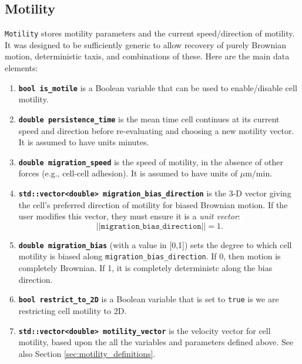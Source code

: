 \documentclass[12pt]{article}
\newcommand{\norm}[1]{\left|\left|{#1}\right|\right|}
\newcommand{\beq}{\begin{equation}}
\newcommand{\eeq}{\end{equation}}
\newcommand{\micron}{\mu\textrm{m}}
\renewcommand{\v}{\verb}
\newcommand{\smallcode}[1]{\textbf{\texttt{#1}}}
\newcommand{\blue}[1]{\textcolor{blue}{#1}}
\newcommand{\DONE}{}%
\begin{document}
\subsection{Motility \DONE}
\label{sec:Motility}
\v|Motility| stores motility parameters and the current speed/direction of motility. It was designed to be sufficiently 
generic to allow recovery of purely Brownian motion, deterministic taxis, and combinations of these. Here are the main 
data elements: 
\begin{enumerate}
\item
\smallcode{bool is\_motile} is a Boolean variable that can be used to enable/disable cell motility. 

\item 
\smallcode{double persistence\_time} is the mean time cell continues at its current speed and direction before 
re-evaluating and choosing a new motility vector. It is assumed to have units minutes. 

\item 
\smallcode{double migration\_speed} is the speed of motility, in the absence of other forces (e.g., cell-cell adhesion). It is 
assumed to have units of $\micron/\textrm{min}$. 

\item 
\smallcode{std::vector<double> migration\_bias\_direction} is the 3-D vector giving the cell's preferred direction of 
motility for biased Brownian motion. If the user modifies this vector, 
they must ensure it is a \emph{unit vector}: 
\beq
\norm{\texttt{migration\_bias\_direction}} = 1. 
\eeq

\item 
\smallcode{double migration\_bias} (with a value in [0,1]) sets the degree to which cell motility is biased along 
\v|migration_bias_direction|. If 0, then motion is completely Brownian. If 1, it is completely deterministc along 
the bias direction. 

\item 
\smallcode{bool restrict\_to\_2D} is a Boolean variable that is set to \v|true| is we are restricting cell motility to 2D. 


\item 
\smallcode{std::vector<double> motility\_vector} is the velocity vector for cell motility, based upon the all the variables and parameters 
defined above. See also Section \ref{sec:motility_definitions}. 
\end{enumerate}
\end{document}
